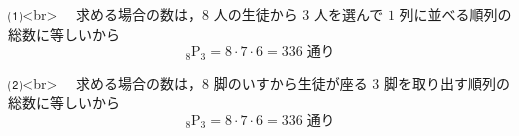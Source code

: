 ⑴<br>
　求める場合の数は，$8$ 人の生徒から $3$ 人を選んで $1$ 列に並べる順列の総数に等しいから
$$
  _{8}\mathrm{P}_{3} = 8 \cdot 7 \cdot 6 = 336 \;\text{通り}
$$

⑵<br>
　求める場合の数は，$8$ 脚のいすから生徒が座る $3$ 脚を取り出す順列の総数に等しいから
$$
  _{8}\mathrm{P}_{3} = 8 \cdot 7 \cdot 6 = 336 \;\text{通り}
$$
